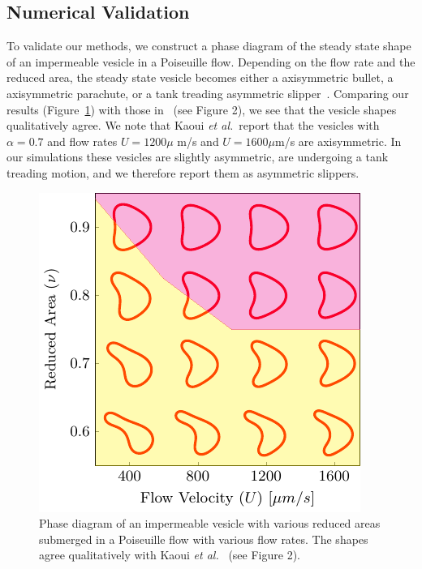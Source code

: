 \documentclass[9pt,twocolumn,twoside,lineno]{pnas-new}
\newif\ifTikz
\begin{document}
\subsection*{Numerical Validation}
To validate our methods, we construct a phase diagram of the steady
state shape of an impermeable vesicle in a Poiseuille flow. Depending on
the flow rate and the reduced area, the steady state vesicle becomes
either a axisymmetric bullet, a axisymmetric parachute, or a tank
treading asymmetric slipper~\cite{kao-bir-mis2009}. Comparing our
results (Figure~\ref{fig:PoiseuillePhase}) with those
in~\cite{kao-bir-mis2009} (see Figure 2), we see that the vesicle shapes
qualitatively agree. We note that Kaoui {\em et al.}~report that the
vesicles with $\alpha=0.7$ and flow rates $U = 1200 \mu$ m/s and $U =
1600 \mu$m/s are axisymmetric.  In our simulations these vesicles are
slightly asymmetric, are undergoing a tank treading motion, and we
therefore report them as asymmetric slippers.
\begin{figure}[htp]
  \centering
  \ifTikz
  
  \else
  \includegraphics{figures/parabolicImpermeable.pdf}
  \fi
  \caption{\label{fig:PoiseuillePhase} Phase diagram of an impermeable
  vesicle with various reduced areas submerged in a Poiseuille flow with
  various flow rates. The shapes agree qualitatively with Kaoui {\em et
  al.}~\cite{kao-bir-mis2009} (see Figure 2).}
\end{figure}

\end{document}
